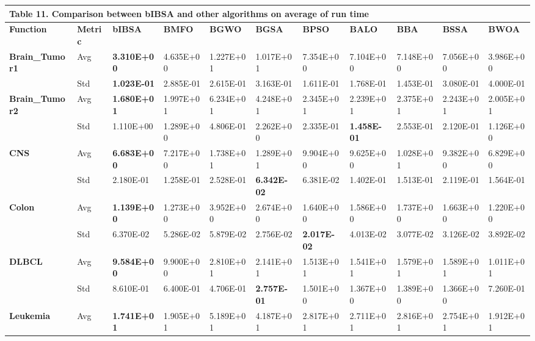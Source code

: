 \documentclass{article} %
\begin{document}
\begin{tabular}{|p{0.6in}|p{0.3in}|p{0.4in}|p{0.4in}|p{0.4in}|p{0.4in}|p{0.4in}|p{0.4in}|p{0.4in}|p{0.4in}|p{0.4in}|} \hline 
\multicolumn{10}{|p{1in}|}{\textbf{Table }11\textbf{. }Comparison between bIBSA and other algorithms on average of run time\textbf{}} & \textbf{} \\ \hline 
\textbf{Function} & \textbf{Metric} & \textbf{bIBSA} & \textbf{BMFO} & \textbf{BGWO} & \textbf{BGSA} & \textbf{BPSO} & \textbf{BALO} & \textbf{BBA} & \textbf{BSSA} & \textbf{BWOA} \\ \hline 
\textbf{Brain\_Tumor1} & Avg & \textbf{3.310E+00} & 4.635E+00 & 1.227E+01 & 1.017E+01 & 7.354E+00 & 7.104E+00 & 7.148E+00 & 7.056E+00 & 3.986E+00 \\ \hline 
\textbf{} & Std & \textbf{1.023E-01} & 2.885E-01 & 2.615E-01 & 3.163E-01 & 1.611E-01 & 1.768E-01 & 1.453E-01 & 3.080E-01 & 4.000E-01 \\ \hline 
\textbf{Brain\_Tumor2} & Avg & \textbf{1.680E+01} & 1.997E+01 & 6.234E+01 & 4.248E+01 & 2.345E+01 & 2.239E+01 & 2.375E+01 & 2.243E+01 & 2.005E+01 \\ \hline 
\textbf{} & Std & 1.110E+00\textbf{} & 1.289E+00 & 4.806E-01 & 2.262E+00 & 2.335E-01 & \textbf{1.458E-01} & 2.553E-01 & 2.120E-01 & 1.126E+00 \\ \hline 
\textbf{CNS} & Avg & \textbf{6.683E+00} & 7.217E+00 & 1.738E+01 & 1.289E+01 & 9.904E+00 & 9.625E+00 & 1.028E+01 & 9.382E+00 & 6.829E+00 \\ \hline 
\textbf{} & Std & 2.180E-01\textbf{} & 1.258E-01 & 2.528E-01 & \textbf{6.342E-02} & 6.381E-02 & 1.402E-01 & 1.513E-01 & 2.119E-01 & 1.564E-01 \\ \hline 
\textbf{Colon} & Avg & \textbf{1.139E+00} & 1.273E+00 & 3.952E+00 & 2.674E+00 & 1.640E+00 & 1.586E+00 & 1.737E+00 & 1.663E+00 & 1.220E+00 \\ \hline 
\textbf{} & Std & 6.370E-02\textbf{} & 5.286E-02 & 5.879E-02 & 2.756E-02 & \textbf{2.017E-02} & 4.013E-02 & 3.077E-02 & 3.126E-02 & 3.892E-02 \\ \hline 
\textbf{DLBCL} & Avg & \textbf{9.584E+00} & 9.900E+00\textbf{} & 2.810E+01 & 2.141E+01 & 1.513E+01 & 1.541E+01 & 1.579E+01 & 1.589E+01 & 1.011E+01 \\ \hline 
\textbf{} & Std & 8.610E-01\textbf{} & 6.400E-01\textbf{} & 4.706E-01 & \textbf{2.757E-01} & 1.501E+00 & 1.367E+00 & 1.389E+00 & 1.366E+00 & 7.260E-01 \\ \hline 
\textbf{Leukemia} & Avg & \textbf{1.741E+01} & 1.905E+01 & 5.189E+01 & 4.187E+01 & 2.817E+01 & 2.711E+01 & 2.816E+01 & 2.754E+01 & 1.912E+01 \\ \hline 

\end{tabular}
\end{document}
